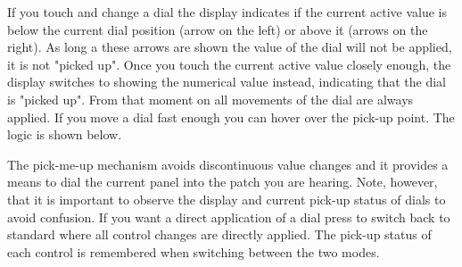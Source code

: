 If you touch and change a dial the display indicates if the current active value is below the current dial position (arrow on the left) or above it (arrows on the right). As long a these arrows are shown the value of the dial will not be applied, it is not "picked up". Once you touch the current active value closely enough, the display switches to showing the numerical value instead, indicating that the dial is "picked up". From that moment on all movements of the dial are always applied. If you move a dial fast enough you can hover over the pick-up point. The logic is shown below.


The pick-me-up mechanism avoids discontinuous value changes and it provides a means to dial the current panel into the patch you are hearing. Note, however, that it is important to observe the display and current pick-up status of dials to avoid confusion. If you want a direct application of a dial press \totape to switch back to standard \presetpatch where all control changes are directly applied. The pick-up status of each control is remembered when switching between the two modes.

